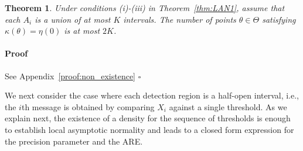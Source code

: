 \documentclass[letterpaper, 11pt]{IEEEtran}      %
\newtheorem{thm}{\bf{Theorem}}
\newenvironment{proof}{\paragraph*{Proof}}{\hfill$\square$ \newline}
\begin{document}
\begin{thm} \label{thm:non_existence}
Under conditions (i)-(iii) in Theorem~\ref{thm:LAN1}, assume that each $A_i$ is a union of at most $K$ intervals. The number of points $\theta \in \Theta$ satisfying $\kappa(\theta) = \eta(0)$ is at most $2K$. 
\end{thm}

\begin{proof}
See Appendix~\ref{proof:non_existence}
\end{proof}

We next consider the case where each detection region is a half-open interval, i.e., the $i$th message is obtained by comparing $X_i$ against a single threshold. As we explain next, the existence of a density for the sequence of thresholds is enough to establish local asymptotic normality and leads to a closed form expression for the precision parameter and the ARE.  

\end{document}
